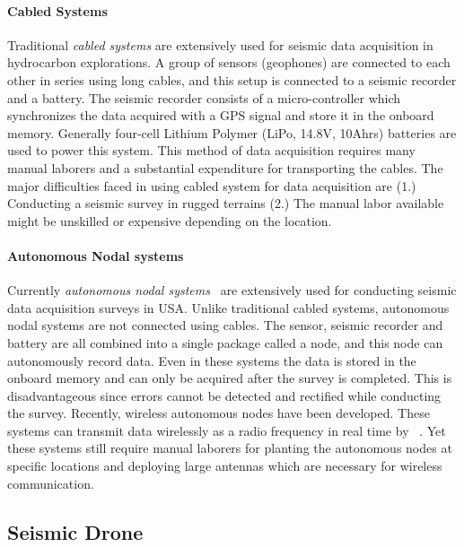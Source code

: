  \paragraph{Cabled Systems}

 Traditional \emph{cabled systems} are extensively used for seismic data acquisition in hydrocarbon explorations. A group of sensors (geophones) are connected to each other in series using long cables, and this setup is connected to a seismic recorder and a battery. The seismic recorder consists of a micro-controller which synchronizes the data acquired with a GPS signal and store it in the onboard memory. Generally four-cell Lithium Polymer (LiPo, 14.8V, 10Ahrs) batteries are used to power this system. This method of data acquisition requires many manual laborers and a substantial expenditure for transporting the cables. The major difficulties faced in using cabled system for data acquisition are (1.) Conducting a seismic survey in rugged terrains (2.) The manual labor available might be unskilled or expensive depending on the location.  
 
 \paragraph{Autonomous Nodal systems}
 Currently \emph{autonomous nodal systems}~\cite{wood1998distributed} are extensively used for conducting seismic data acquisition surveys in USA. Unlike traditional cabled systems, autonomous nodal systems are not connected using cables. The sensor, seismic recorder and battery are all combined into a single package called a node, and this node can autonomously record data. Even in these systems the data is stored in the onboard memory and can only be acquired after the survey is completed. This is disadvantageous since errors cannot be detected and rectified while conducting the survey. Recently, wireless autonomous nodes have been developed. These systems can transmit data wirelessly as a radio frequency in real time by ~\cite{jiang2015geophysical}. Yet these systems still require manual laborers for planting the autonomous nodes at specific locations and deploying large antennas which are necessary for wireless communication.
 
\subsection{Seismic Drone}  

